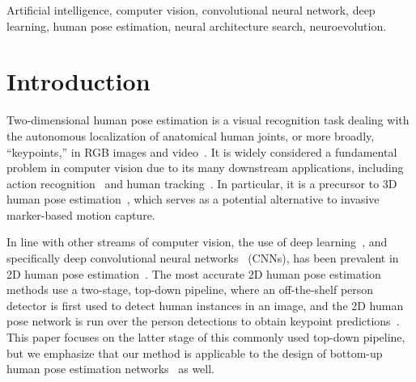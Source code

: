 \documentclass{ieeeaccess}
\begin{document}
\begin{keywords}
Artificial intelligence, computer vision, convolutional neural network, deep learning, human pose estimation, neural architecture search, neuroevolution.
\end{keywords}

\titlepgskip=-15pt

\maketitle

\section{Introduction}
Two-dimensional human pose estimation is a visual recognition task dealing with the autonomous localization of anatomical human joints, or more broadly, ``keypoints,'' in RGB images and video~\cite{toshev2014deeppose, tompson2014joint, andriluka20142d, kim2020pose, wang2019human}. It is widely considered a fundamental problem in computer vision due to its many downstream applications, including action recognition~\cite{cheron2015p, ullah2017action, el2018human, mcnally2019star, mcnally2018action, mcnally2019golfdb} and human tracking~\cite{insafutdinov2017arttrack, andriluka2018posetrack, xiao2018simple}. In particular, it is a precursor to 3D human pose estimation~\cite{martinez2017simple, pavllo20193d, liang2020adaptive}, which serves as a potential alternative to invasive marker-based motion capture.

In line with other streams of computer vision, the use of deep learning~\cite{chen2014big, lecun2015deep}, and specifically deep convolutional neural networks~\cite{lecun1995convolutional} (CNNs), has been prevalent in 2D human pose estimation~\cite{toshev2014deeppose, tompson2014joint, newell2016stacked, cao2017realtime, chen2018cascaded, xiao2018simple, sun2019deep}. The most accurate 2D human pose estimation methods use a two-stage, top-down pipeline, where an off-the-shelf person detector is first used to detect human instances in an image, and the 2D human pose network is run over the person detections to obtain keypoint predictions~\cite{chen2018cascaded, xiao2018simple, sun2019deep}. This paper focuses on the latter stage of this commonly used top-down pipeline, but we emphasize that our method is applicable to the design of bottom-up human pose estimation networks~\cite{cao2017realtime, cheng2020higherhrnet} as well.
\end{document}
